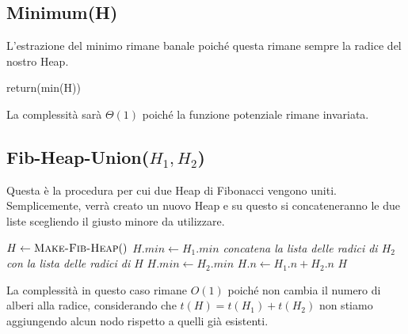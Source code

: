 \subsection{Minimum(H)}
L'estrazione del minimo rimane banale poiché questa rimane sempre la radice del nostro Heap.
\begin{algorithm}[H]
\caption{FIB-HEAP-INSERT($H, x$)}
\begin{algorithmic}[1]
    \State return(min(H))
\end{algorithmic}
\end{algorithm}
La complessità sarà $\Theta(1)$ poiché la funzione potenziale rimane invariata.
\subsection{Fib-Heap-Union($H_1,H_2$)}
Questa è la procedura per cui due Heap di Fibonacci vengono uniti. Semplicemente, verrà creato un nuovo Heap e su questo si concateneranno le due liste scegliendo il giusto minore da utilizzare. 
\begin{algorithm}[H]
\caption{FIB-HEAP-UNION($H_1, H_2$)}
\begin{algorithmic}[1]
    \State $H \gets \textsc{Make-Fib-Heap}()$
    \State $H.min \gets H_1.min$
    \State \textit{concatena la lista delle radici di $H_2$ con la lista delle radici di $H$}
        \State $H.min \gets H_2.min$
    \EndIf
    \State $H.n \gets H_1.n + H_2.n$
    \State \Return $H$
\end{algorithmic}
\end{algorithm}
La complessità in questo caso rimane $O(1)$ poiché non cambia il numero di alberi alla radice, considerando che $t(H) = t(H_1)+t(H_2)$ non stiamo aggiungendo alcun nodo rispetto a quelli già esistenti.
